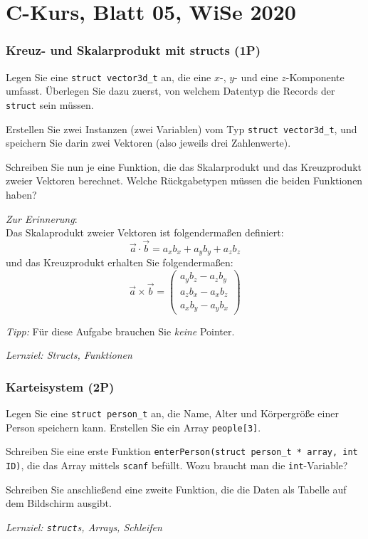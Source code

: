 \documentclass[
	ngerman,
	fontsize=10pt,
	parskip=half,
	titlepage=true,
	DIV=12
]{scrartcl}
\begin{document}
\part*{C-Kurs, Blatt 05, WiSe 2020}

\section{Kreuz- und Skalarprodukt mit structs (1P)}
Legen Sie eine \texttt{struct vector3d\_t} an, die eine $x$-, $y$- und eine $z$-Komponente umfasst. Überlegen Sie dazu zuerst, von welchem Datentyp die Records der \texttt{struct} sein müssen.

Erstellen Sie zwei Instanzen (zwei Variablen) vom Typ \texttt{struct vector3d\_t}, und speichern Sie darin zwei Vektoren (also jeweils drei Zahlenwerte).

Schreiben Sie nun je eine Funktion, die das Skalarprodukt und das Kreuzprodukt zweier Vektoren berechnet.
Welche Rückgabetypen müssen die beiden Funktionen haben?

\emph{Zur Erinnerung}:\\
Das Skalaprodukt zweier Vektoren ist folgendermaßen definiert:
\[ \vec{a} \cdot \vec{b} = a_x b_x + a_y b_y + a_z b_z \]
und das Kreuzprodukt erhalten Sie folgendermaßen:
\[
	\vec{a} \times \vec{b} =
	\begin{pmatrix}
		a_y b_z - a_z b_y\\
		a_z b_x - a_x b_z\\
		a_x b_y - a_y b_x
	\end{pmatrix}
\]

\emph{Tipp:} Für diese Aufgabe brauchen Sie \emph{keine} Pointer.

\emph{Lernziel: Structs, Funktionen}


\section{Karteisystem (2P)}
Legen Sie eine \texttt{struct person\_t} an, die Name, Alter und Körpergröße einer Person speichern kann. Erstellen Sie ein Array \texttt{people[3]}.

Schreiben Sie eine erste Funktion \texttt{enterPerson(struct person\_t * array, int ID)}, die das Array mittels \texttt{scanf} befüllt. Wozu braucht man die \texttt{int}-Variable?

Schreiben Sie anschließend eine zweite Funktion, die die Daten als Tabelle auf dem Bildschirm ausgibt.

\emph{Lernziel: \texttt{struct}s, Arrays, Schleifen}
\end{document}

